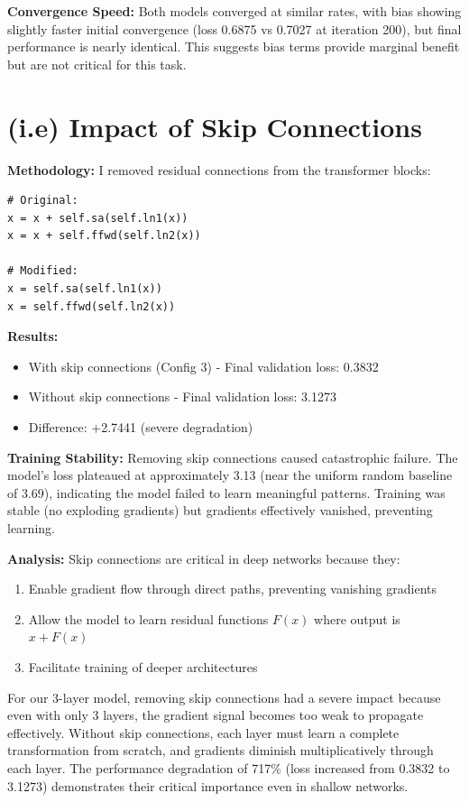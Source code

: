 \documentclass[11pt]{article}
\begin{document}
\textbf{Convergence Speed:} Both models converged at similar rates, with bias showing slightly faster initial convergence (loss 0.6875 vs 0.7027 at iteration 200), but final performance is nearly identical. This suggests bias terms provide marginal benefit but are not critical for this task.

\section*{(i.e) Impact of Skip Connections}

\textbf{Methodology:} I removed residual connections from the transformer blocks:

\begin{lstlisting}
# Original:
x = x + self.sa(self.ln1(x))
x = x + self.ffwd(self.ln2(x))

# Modified:
x = self.sa(self.ln1(x))
x = self.ffwd(self.ln2(x))
\end{lstlisting}

\textbf{Results:}
\begin{itemize}
    \item With skip connections (Config 3) - Final validation loss: 0.3832
    \item Without skip connections - Final validation loss: 3.1273
    \item Difference: +2.7441 (severe degradation)
\end{itemize}

\textbf{Training Stability:} Removing skip connections caused catastrophic failure. The model's loss plateaued at approximately 3.13 (near the uniform random baseline of 3.69), indicating the model failed to learn meaningful patterns. Training was stable (no exploding gradients) but gradients effectively vanished, preventing learning.

\textbf{Analysis:} Skip connections are critical in deep networks because they:
\begin{enumerate}
    \item Enable gradient flow through direct paths, preventing vanishing gradients
    \item Allow the model to learn residual functions $F(x)$ where output is $x + F(x)$
    \item Facilitate training of deeper architectures
\end{enumerate}

For our 3-layer model, removing skip connections had a severe impact because even with only 3 layers, the gradient signal becomes too weak to propagate effectively. Without skip connections, each layer must learn a complete transformation from scratch, and gradients diminish multiplicatively through each layer. The performance degradation of 717\% (loss increased from 0.3832 to 3.1273) demonstrates their critical importance even in shallow networks.
\end{document}

